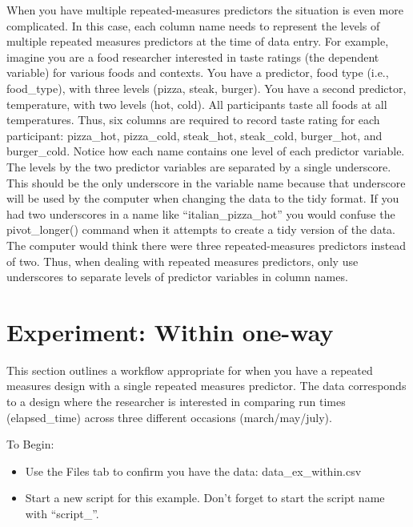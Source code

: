 \documentclass[
]{krantz}
\begin{document}
When you have multiple repeated-measures predictors the situation is even more complicated. In this case, each column name needs to represent the levels of multiple repeated measures predictors at the time of data entry. For example, imagine you are a food researcher interested in taste ratings (the dependent variable) for various foods and contexts. You have a predictor, food type (i.e., food\_type), with three levels (pizza, steak, burger). You have a second predictor, temperature, with two levels (hot, cold). All participants taste all foods at all temperatures. Thus, six columns are required to record taste rating for each participant: pizza\_hot, pizza\_cold, steak\_hot, steak\_cold, burger\_hot, and burger\_cold. Notice how each name contains one level of each predictor variable. The levels by the two predictor variables are separated by a single underscore. This should be the only underscore in the variable name because that underscore will be used by the computer when changing the data to the tidy format. If you had two underscores in a name like ``italian\_pizza\_hot'' you would confuse the pivot\_longer() command when it attempts to create a tidy version of the data. The computer would think there were three repeated-measures predictors instead of two. Thus, when dealing with repeated measures predictors, only use underscores to separate levels of predictor variables in column names.

\hypertarget{experiment-within-one-way}{%
\section{Experiment: Within one-way}\label{experiment-within-one-way}}

This section outlines a workflow appropriate for when you have a repeated measures design with a single repeated measures predictor. The data corresponds to a design where the researcher is interested in comparing run times (elapsed\_time) across three different occasions (march/may/july).

To Begin:

\begin{itemize}
\item
  Use the Files tab to confirm you have the data: data\_ex\_within.csv
\item
  Start a new script for this example. Don't forget to start the script name with ``script\_''.
\end{itemize}
\end{document}
